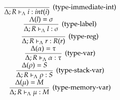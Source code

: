 \begin{equation*}
    \begin{array}{c}
        \infer[(\text{type-immediate-int})]
            {\Delta; R \vdash_\Lambda i : int(i)}
            {}
        \\
        \infer[(\text{type-label})]
            {\Delta; R \vdash_\Lambda l : \sigma}
            {\Lambda(l) = \sigma}
        \\
        \infer[(\text{type-reg})]
            {\Delta; R \vdash_\Lambda r : R(r)}
            {}
        \\
        \infer[(\text{type-var})]
            {
                \Delta; R 
                \vdash_\Lambda 
                \alpha : \tau
            }
            {\Delta(\alpha) = \tau}
        \\
        \infer[(\text{type-stack-var})]
            {
                \Delta; R 
                \vdash_\Lambda 
                \rho : S
            }
            {\Delta(\rho) = S}
        \\
        \infer[(\text{type-memory-var})]
            {
                \Delta; R 
                \vdash_\Lambda 
                \mu : M
            }
            {\Delta(\mu) = M}
        \\
    \end{array}
\end{equation*}
